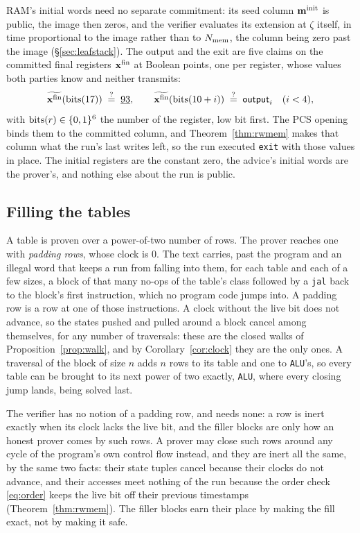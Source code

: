 RAM's initial words need no separate commitment: its seed column $\mathbf{m}^{\mathrm{init}}$ is public, the image then zeros, and the verifier evaluates its extension at $\zeta$ itself, in time proportional to the image rather than to $N_{\mathrm{mem}}$, the column being zero past the image (\S\ref{sec:leafstack}). The output and the exit are five claims on the committed final registers $\mathbf{x}^{\mathrm{fin}}$ at Boolean points, one per register, whose values both parties know and neither transmits:
\[
  \widetilde{\mathbf{x}^{\mathrm{fin}}}(\mathrm{bits}(17))\;\stackrel{?}{=}\;\underline{93},\qquad \widetilde{\mathbf{x}^{\mathrm{fin}}}(\mathrm{bits}(10+i))\;\stackrel{?}{=}\;\textsf{output}_i\quad(i<4),
\]
with $\mathrm{bits}(r)\in\{0,1\}^{6}$ the number of the register, low bit first. The PCS opening binds them to the committed column, and Theorem~\ref{thm:rwmem} makes that column what the run's last writes left, so the run executed \texttt{exit} with those values in place. The initial registers are the constant zero, the advice's initial words are the prover's, and nothing else about the run is public.

\subsection{Filling the tables}\label{sec:e2e-pad}

A table is proven over a power-of-two number of rows. The prover reaches one with \emph{padding rows}, whose clock is $0$. The text carries, past the program and an illegal word that keeps a run from falling into them, for each table and each of a few sizes, a block of that many no-ops of the table's class followed by a \texttt{jal} back to the block's first instruction, which no program code jumps into. A padding row is a row at one of those instructions. A clock without the live bit does not advance, so the states pushed and pulled around a block cancel among themselves, for any number of traversals: these are the closed walks of Proposition~\ref{prop:walk}, and by Corollary~\ref{cor:clock} they are the only ones. A traversal of the block of size $n$ adds $n$ rows to its table and one to \texttt{ALU}'s, so every table can be brought to its next power of two exactly, \texttt{ALU}, where every closing jump lands, being solved last.

The verifier has no notion of a padding row, and needs none: a row is inert exactly when its clock lacks the live bit, and the filler blocks are only how an honest prover comes by such rows. A prover may close such rows around any cycle of the program's own control flow instead, and they are inert all the same, by the same two facts: their state tuples cancel because their clocks do not advance, and their accesses meet nothing of the run because the order check \eqref{eq:order} keeps the live bit off their previous timestamps (Theorem~\ref{thm:rwmem}). The filler blocks earn their place by making the fill exact, not by making it safe.

